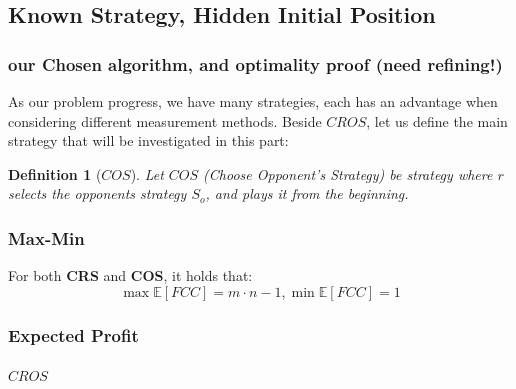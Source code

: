 \documentclass[a4paper,10pt]{article}
\newtheorem{definition}{Definition}
\newcommand\rob{\ensuremath{r}\xspace}
\newcommand\opp{\ensuremath{o}\xspace}
\newcommand{\fcc}{\ensuremath{FCC}\xspace}
\newcommand{\cros}{\ensuremath{CROS}\xspace}
\newcommand{\coos}{\ensuremath{COS}\xspace}
\begin{document}
\subsection{Known Strategy, Hidden Initial Position}
\subsubsection{our Chosen algorithm, and optimality proof (need refining!)}
As our problem progress, we have many strategies, each has an advantage when considering different measurement methods. 
Beside \textbf{\cros}, let us define the main strategy that will be investigated in this part:
\begin{definition}[\textbf{\coos}]
Let \textbf{\coos} (Choose Opponent's Strategy) be strategy where \rob selects the opponents strategy $S_{\opp}$, and plays it from the beginning.
\end{definition}

\subsubsection{Max-Min}
For both \textbf{CRS} and \textbf{COS}, it holds that: \[\max\mathbb{E}[\fcc]=m\cdot n-1, \min\mathbb{E}[\fcc]=1\]

\subsubsection{Expected Profit}

\paragraph*{\cros}
\end{document}
